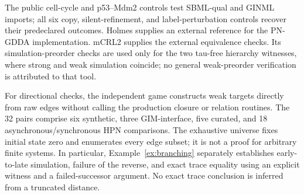 \begin{table}[!htbp]
\end{table}

The public cell-cycle and p53--Mdm2 controls test SBML-qual and GINML imports;
all six copy, silent-refinement, and label-perturbation controls recover their
predeclared outcomes.\cite{Naldi2018,Chaouiya2013SBML,Traynard2016,AbouJaoude2009}
Holmes supplies an external reference for the PN-GDDA implementation.
\cite{Radom2017} mCRL2 supplies the external equivalence checks.
\cite{Bunte2019} Its simulation-preorder checks are used only for the two
tau-free hierarchy witnesses, where strong and weak simulation coincide;
no general weak-preorder verification is attributed to that tool.

For directional checks, the independent game constructs weak targets directly
from raw edges without calling the production closure or relation routines.
The 32 pairs comprise six synthetic, three GIM-interface, five curated, and
18 asynchronous/synchronous HPN comparisons. The exhaustive universe fixes
initial state zero and enumerates every edge subset; it is not a proof for
arbitrary finite systems. In particular, Example~\ref{ex:branching} separately
establishes early-to-late simulation, failure of the reverse, and exact trace
equality using an explicit witness and a failed-successor argument. No exact
trace conclusion is inferred from a truncated distance.

